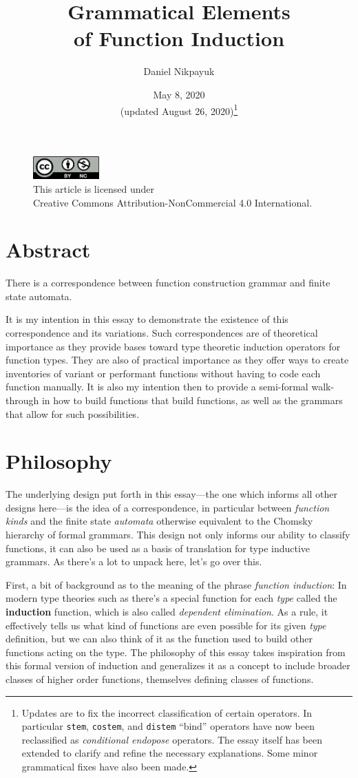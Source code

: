 \documentclass[twoside]{article}
\title{Grammatical Elements\\of Function Induction}
\author{Daniel Nikpayuk}
\date{May 8, 2020\\[2ex](updated August 26, 2020)\footnote{Updates are to fix the incorrect classification of certain operators.
In particular \texttt{stem}, \texttt{costem}, and \texttt{distem} ``bind'' operators have now been reclassified as
\emph{conditional endopose} operators. The essay itself has been extended to clarify and refine the necessary explanations.
Some minor grammatical fixes have also been made.}}
\newcommand{\strong}[1]{{\bfseries #1}}
\begin{document}
\maketitle
\thispagestyle{empty}

\begin{figure}[h]
\centering
\includegraphics[width=1in]{../../../../cc-by-nc.png}\\[0.1in]
\tiny This article is licensed under \\
Creative Commons Attribution-NonCommercial 4.0 International.\\[0.3in]
\end{figure}

\section*{Abstract}

There is a correspondence between function construction grammar and finite state automata.

It is my intention in this essay to demonstrate the existence of this correspondence and its variations. Such correspondences
are of theoretical importance as they provide bases toward type theoretic induction operators for function types. They are
also of practical importance as they offer ways to create inventories of variant or performant functions without having
to code each function manually. It is also my intention then to provide a semi-formal walk-through in how to build
functions that build functions, as well as the grammars that allow for such possibilities.

\section*{Philosophy}

The underlying design put forth in this essay---the one which informs all other designs here---is the idea of
a correspondence, in particular between \emph{function kinds} and the finite state \emph{automata} otherwise equivalent
to the Chomsky hierarchy of formal grammars. This design not only informs our ability to classify functions, it can also
be used as a basis of translation for type inductive grammars. As there's a lot to unpack here, let's go over this.

First, a bit of background as to the meaning of the phrase \emph{function induction}: In modern type theories such as
\cite{hott} there's a special function for each \emph{type} called the \strong{induction} function, which is also called
\emph{dependent elimination}. As a rule, it effectively tells us what kind of functions are even possible for its given
\emph{type} definition, but we can also think of it as the function used to build other functions acting on the type.
The philosophy of this essay takes inspiration from this formal version of induction and generalizes it as a concept
to include broader classes of higher order functions, themselves defining classes of functions.
\end{document}
